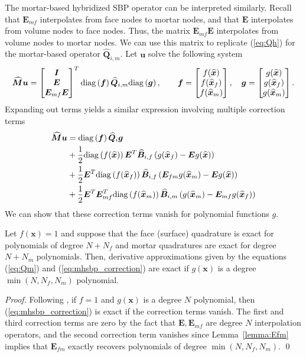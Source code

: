 \documentclass{svjour3}                     %
\renewcommand{\hat}{\widehat}
\newcommand{\diag}[1]{{\rm diag}\LRp{#1}}
\newcommand{\LRp}[1]{\left( #1 \right)}
\begin{document}
The mortar-based hybridized SBP operator can be interpreted similarly.  Recall that $\bm{E}_{mf}$ interpolates from face nodes to mortar nodes, and that $\bm{E}$ interpolates from volume nodes to face nodes.  Thus, the matrix $\bm{E}_{mf}\bm{E}$ interpolates from volume nodes to mortar nodes.  We can use this matrix to replicate (\ref{eq:Qh}) for the mortar-based operator $\hat{\bm{Q}}_{i,m}$.  Let $\bm{u}$ solve the following system
\begin{align}
\hat{\bm{M}}\bm{u} = \begin{bmatrix}
\bm{I}\\
\bm{E}\\
\bm{E}_{mf}\bm{E}
\end{bmatrix}^T \diag{\bm{f}}\hat{\bm{Q}}_{i,m} \diag{\bm{g}}, \qquad \bm{f} = \begin{bmatrix} f(\hat{\bm{x}}) \\ f(\hat{\bm{x}}_f)\\ f(\hat{\bm{x}}_m)\end{bmatrix}, \quad \bm{g} = \begin{bmatrix} g(\hat{\bm{x}}) \\ g(\hat{\bm{x}}_f)\\ g(\hat{\bm{x}}_m)\end{bmatrix}.
\label{eq:Qm}
\end{align}
Expanding out terms yields a similar expression involving multiple correction terms
\begin{align}
\hat{\bm{M}}\bm{u} &= \diag{\bm{f}}\hat{\bm{Q}}_i\bm{g} \label{eq:mhsbp_correction}\\
&+ \frac{1}{2} \diag{f(\hat{\bm{x}})}\bm{E}^T\hat{\bm{B}}_{i,f}\LRp{g(\hat{\bm{x}}_f) - \bm{E}g(\hat{\bm{x}})} \nonumber\\
&+ \frac{1}{2} \bm{E}^T\diag{f(\hat{\bm{x}}_f)}\hat{\bm{B}}_{i,f}\LRp{\bm{E}_{fm}g(\hat{\bm{x}}_m) - \bm{E}g(\hat{\bm{x}})} \nonumber\\
&+ \frac{1}{2} \bm{E}^T\bm{E}_{mf}^T\diag{f(\hat{\bm{x}}_m)}\hat{\bm{B}}_{i,m}\LRp{g(\hat{\bm{x}}_m) - \bm{E}_{mf}g(\hat{\bm{x}}_f)} \nonumber
\end{align}
We can show that these correction terms vanish for polynomial functions $g$.  %

\begin{lemma}
Let $f(\bm{x}) = 1$ and suppose that the face (surface) quadrature is exact for polynomials of degree $N+N_f$ and mortar quadratures are exact for degree $N+N_m$ polynomials.  Then, derivative approximations given by the equations (\ref{eq:Qm}) and (\ref{eq:mhsbp_correction}) are exact if $g(\bm{x})$ is a degree $\min(N,N_f,N_m)$ polynomial.
\end{lemma}
\begin{proof}
Following \cite{chan2017discretely}, if $f = 1$  and $g(\bm{x})$ is a degree $N$ polynomial, then  (\ref{eq:mhsbp_correction}) is exact if the correction terms vanish.  The first and third correction terms are zero by the fact that $\bm{E}, \bm{E}_{mf}$ are degree $N$ interpolation operators, and the second correction term vanishes since Lemma~\ref{lemma:Efm} implies that $\bm{E}_{fm}$ exactly recovers polynomials of degree $\min(N,N_f,N_m)$.
\qed\end{proof}
\end{document}
